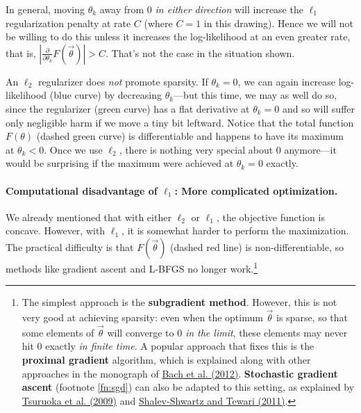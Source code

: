 \documentclass[11pt]{article}
\newcommand{\vtheta}{\vec{\theta}}
\newcommand{\diffk}{\frac{\partial}{\partial \theta_k}}
\begin{document}
In general, moving $\theta_k$ away from 0 {\em in either direction} will increase the $\ell_1$ regularization penalty at rate $C$ (where $C=1$ in this drawing).  Hence we will not be willing to do this unless it increases the log-likelihood at an even greater rate, that is, $|\diffk F(\vtheta)| > C$.  That's not the case in the situation shown.

An $\ell_2$ regularizer does {\em not} promote sparsity.  If $\theta_k=0$, we can again increase log-likelihood (blue curve) by decreasing $\theta_k$---but this time, we may as well do so, since the regularizer (green curve) has a flat derivative at $\theta_k=0$ and so will suffer only negligible harm if we move a tiny bit leftward.  Notice that the total function $F(\theta)$ (dashed green curve) is differentiable and happens to have its maximum at $\theta_k < 0$. Once we use $\ell_2$, there is nothing very special about 0 anymore---it would be surprising if the maximum were achieved at $\theta_k=0$ exactly.

\paragraph{Computational disadvantage of $\ell_1$: More complicated optimization.}
We already mentioned that with either $\ell_2$ or $\ell_1$, the objective function is concave.
However, with $\ell_1$, it is somewhat harder to perform the maximization.  The practical difficulty is that $F(\vtheta)$ (dashed red line) is non-differentiable, so methods like gradient ascent and L-BFGS no longer work.\footnote{The simplest approach is the {\bf subgradient method}.  However, this is not very good at achieving sparsity: even when the optimum $\vtheta$ is sparse, so that some elements of $\vtheta$ will converge to 0 {\em in the limit}, these elements may never hit 0 exactly {\em in finite time}.  A popular approach that fixes this is the {\bf proximal gradient} algorithm, which is explained along with other approaches in the monograph of \href{http://www.di.ens.fr/~fbach/bach_jenatton_mairal_obozinski_FOT.pdf}{Bach et al. (2012)}.  {\bf Stochastic gradient ascent} (footnote \ref{fn:sgd}) can also be adapted to this setting, as explained by \href{http://www.aclweb.org/anthology/P09-1054}{Tsuruoka et al. (2009)} and \href{http://www.jmlr.org/papers/volume12/shalev-shwartz11a/shalev-shwartz11a.pdf}{Shalev-Shwartz and Tewari (2011)}.}
\end{document}
